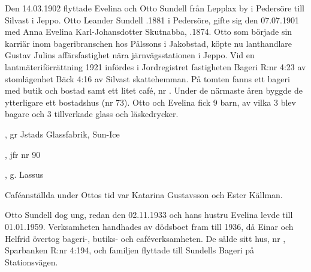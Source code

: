 Den 14.03.1902  flyttade Evelina och Otto Sundell från Lepplax by i Pedersöre till Silvast i Jeppo. Otto Leander Sundell .1881 i Pedersöre, gifte sig den 07.07.1901 med Anna Evelina Karl-Johansdotter Skutnabba, .1874. Otto som började sin karriär inom bageribranschen hos Pålssons i Jakobstad, köpte nu lanthandlare Gustav Julins affärsfastighet nära järnvägsstationen i Jeppo. Vid en lantmäteriförrättning 1921 infördes i Jordregistret fastigheten Bageri R:nr 4:23 av stomlägenhet Bäck 4:16 av Silvast skattehemman. På tomten fanns ett bageri med butik och bostad samt ett litet café, nr . Under de närmaste åren byggde de ytterligare ett bostadshus (nr 73). Otto och Evelina fick 9 barn, av vilka 3 blev bagare och 3 tillverkade glass och läskedrycker.
\begin{jhchildren}
  \item {}
  \item {}
  \item {}
  \item {}
  \item {}, gr Jstads Glassfabrik, Sun-Ice
  \item {}
  \item {}, jfr nr 90
  \item {}
  \item {}, g. Lassus
\end{jhchildren}

Caféanställda under Ottos tid var Katarina Gustavsson och Ester Källman.

Otto Sundell dog ung, redan den 02.11.1933 och hans hustru Evelina levde till 01.01.1959. Verksamheten handhades av dödsboet fram till 1936, då Einar och	Helfrid övertog bageri-, butiks- och caféverksamheten. De sålde sitt hus, nr , Sparbanken R:nr 4:194, och familjen flyttade till Sundells Bageri på Stationsvägen.


